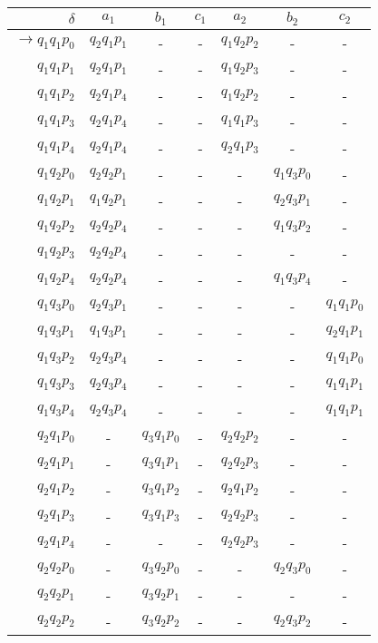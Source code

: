 \begin{table}[H]
\centering
\begin{tabular}{|r|cccccc|}
\hline
$\delta$ & $a_1$ & $b_1$ & $c_1$ & $a_2$ & $b_2$ & $c_2$\\ \hline
 $ \rightarrow q_1 q_1 p_0$ & $q_2 q_1 p_1$ & -  & - & $q_1 q_2 p_2$ & - & - \\
 $q_1 q_1 p_1$ & $q_2 q_1 p_1$ & - & - & $q_1 q_2 p_3$ & - & - \\
 $q_1 q_1 p_2$ & $q_2 q_1 p_4$ & - & - & $q_1 q_2  p_2$  & - & - \\
 $q_1 q_1 p_3$ & $q_2 q_1 p_4$ & - & - & $q_1 q_1 p_3$ & - & - \\
 $q_1 q_1 p_4$ & $q_2 q_1 p_4$ & - & - & $q_2 q_1 p_3$ & - & - \\ \hline
 $q_1 q_2 p_0$ & $q_2 q_2 p_1$ & - & - & - & $q_1 q_3 p_0$ & - \\
 $q_1 q_2 p_1$ & $q_1 q_2 p_1$ & - & - & - & $q_2 q_3 p_1$ & - \\
 $q_1 q_2 p_2$ & $q_2 q_2 p_4$ & - & - & - & $q_1 q_3 p_2$ & - \\
 $q_1 q_2 p_3$ & $q_2 q_2 p_4$ & - & - & - & - & - \\
 $q_1 q_2 p_4$ & $q_2 q_2 p_4$ & - & - & - & $q_1 q_3 p_4$ & - \\ \hline
 $q_1 q_3 p_0$ & $q_2 q_3 p_1$ & - & - & - & - & $q_1 q_1 p_0$ \\
 $q_1 q_3 p_1$ & $q_1 q_3 p_1$ & - & - & - & - & $q_2 q_1 p_1$ \\
 $q_1 q_3 p_2$ & $q_2 q_3 p_4$ & - & - & - & - & $q_1 q_1 p_0$ \\
 $q_1 q_3 p_3$ & $q_2 q_3 p_4$ & - & - & - & - & $q_1 q_1 p_1$ \\
 $q_1 q_3 p_4$ & $q_2 q_3 p_4$ & - & - & - & - & $q_1 q_1 p_1$  \\ \hline
 $q_2 q_1 p_0$ & - & $q_3 q_1 p_0$ & - & $q_2 q_2 p_2$ & - & - \\
 $q_2 q_1 p_1$ & - & $q_3 q_1 p_1$ & - & $q_2 q_2 p_3$ & - & - \\
 $q_2 q_1 p_2$ & - & $q_3 q_1 p_2$ & - & $q_2 q_1 p_2$ & - & - \\
 $q_2 q_1 p_3$ & - & $q_3 q_1 p_3$ & - & $q_2 q_2 p_3$ & - & - \\
 $q_2 q_1 p_4$ & - & - & - & $q_2 q_2 p_3$ & - & - \\ \hline
 $q_2 q_2 p_0$ & - & $q_3 q_2 p_0$ & - & - & $q_2 q_3 p_0$ & - \\
 $q_2 q_2 p_1$ & - & $q_3 q_2 p_1$ & - & - & - & - \\
 $q_2 q_2 p_2$ & - & $q_3 q_2 p_2$ & - & - & $q_2 q_3 p_2$ & - \\

\end{tabular}
\end{table}
